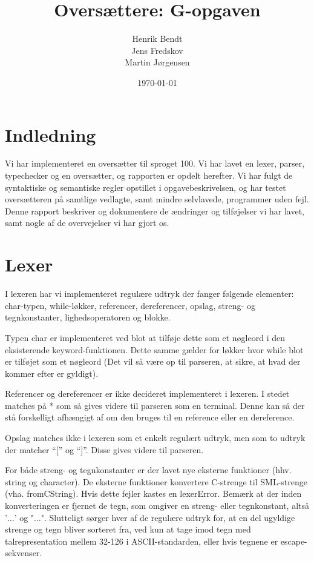 \documentclass[a4paper, 10pt]{article}
\author{Henrik Bendt \\ Jens Fredskov \\ Martin Jørgensen}
\title{Oversættere: G-opgaven}
\date{\today}
\begin{document}
\maketitle
\pagebreak
\tableofcontents
\pagebreak

\section{Indledning}
Vi har implementeret en oversætter til sproget 100. Vi har lavet en lexer, parser, typechecker og en oversætter, og rapporten er opdelt herefter. 
Vi har fulgt de syntaktiske og semantiske regler opstillet i opgavebeskrivelsen, og har testet oversætteren på samtlige vedlagte, samt mindre selvlavede, programmer uden fejl. Denne rapport beskriver og dokumentere de ændringer og tilføjelser vi har lavet, samt nogle af de overvejelser vi har gjort os.

\section{Lexer}
I lexeren har vi implementeret regulære udtryk der fanger følgende elementer:
char-typen, while-løkker, referencer, dereferencer, opslag, streng- og tegnkonstanter,
lighedsoperatoren og blokke.

Typen char er implementeret ved blot at tilføje dette som et nøgleord i den
eksisterende keyword-funktionen. Dette samme gælder for løkker hvor while blot
er tilføjet som et nøgleord (Det vil så være op til parseren, at sikre, at hvad
der kommer efter er gyldigt).

Referencer og dereferencer er ikke decideret implementeret i lexeren. I stedet
matches på * som så gives videre til parseren som en terminal. Denne kan så
der stå forskelligt afhængigt af om den bruges til en reference eller en
dereference.

Opslag matches ikke i lexeren som et enkelt regulært udtryk, men som to udtryk
der matcher ``['' og ``]''. Disse gives videre til parseren.

For både streng- og tegnkonstanter er der lavet nye eksterne funktioner (hhv.
string og character). De eksterne funktioner konvertere C-strenge til
SML-strenge (vha. fromCString). Hvis dette fejler kastes en lexerError. Bemærk
at der inden konverteringen er fjernet de tegn, som omgiver en streng- eller
tegnkonstant, altså '$\ldots$' og "$\ldots$". Slutteligt sørger hver af de
regulære udtryk for, at en del ugyldige strenge og tegn bliver sorteret
fra, ved kun at tage imod tegn med talrepresentation mellem 32-126 i ASCII-standarden, eller hvis tegnene er escape-sekvenser.
\end{document}
